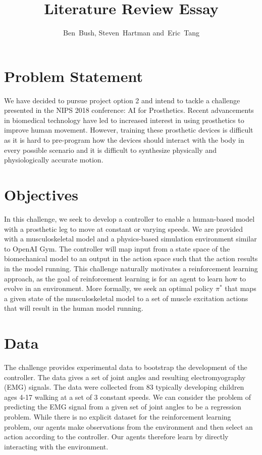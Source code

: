 \documentclass[journal,onecolumn]{IEEEtran}
\begin{document}
\title{Literature Review Essay}
\author{Ben~Bush,
        Steven~Hartman
        and~Eric~Tang%
        }
\maketitle               
\section{Problem Statement}
We have decided to pursue project option 2 and intend to tackle a challenge presented in the NIPS 2018 conference: AI for Prosthetics. Recent advancements in biomedical technology have led to increased interest in using prosthetics to improve human movement. However, training these prosthetic devices is difficult as it is hard to pre-program how the devices should interact with the body in every possible scenario and it is difficult to synthesize
physically and physiologically accurate motion.
\section{Objectives}
In this challenge, we seek to develop a controller to enable a human-based model with a prosthetic leg to move at constant or varying speeds. We are provided with a musculoskeletal model and a physics-based simulation environment similar to OpenAI Gym. The controller will map
input from a state space of the biomechanical model to an output in the action space such that the action results in the model running. This challenge naturally motivates a reinforcement learning approach, as the goal of reinforcement learning is for an agent to learn how to evolve in an environment. More formally, we seek an optimal policy $\pi^{*}$ that maps a given state of the musculoskeletal model to a set of muscle excitation actions that will result in the human model
running. 
\section{Data}
The challenge provides experimental data to bootstrap the development of the controller. The data gives a set of joint angles and resulting electromyography (EMG) signals. The data were collected from 83 typically developing children ages 4-17 walking at a set of 3 constant speeds. We can consider the problem of predicting the EMG signal from a given set of joint angles to be a regression problem. While there is no explicit dataset for the reinforcement learning problem, our agents make observations from the environment and then select an action according to the controller. Our agents therefore learn by directly interacting with the environment. 
\end{document}
